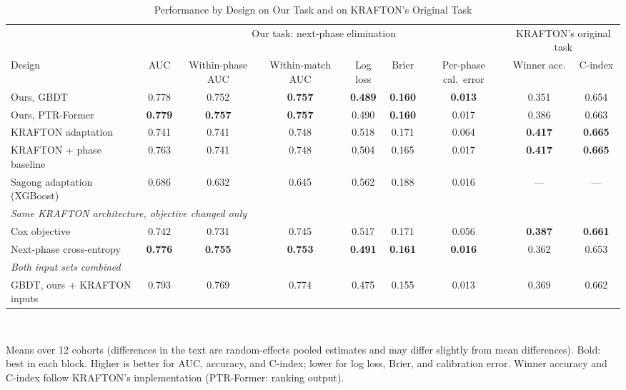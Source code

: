 \documentclass[conference]{IEEEtran}
\begin{document}
\begin{table}[t]
\centering
\caption{Performance by Design on Our Task and on KRAFTON's Original Task}
\label{tab:main}
\footnotesize
\setlength{\tabcolsep}{4pt}
\begin{tabular}{lcccccccc}
\hline
 & \multicolumn{6}{c}{Our task: next-phase elimination} & \multicolumn{2}{c}{KRAFTON's original task} \\
\cline{2-7}\cline{8-9}
Design & AUC & Within-phase AUC & Within-match AUC & Log loss & Brier & Per-phase cal.\ error & Winner acc. & C-index \\
\hline
Ours, GBDT & 0.778 & 0.752 & \textbf{0.757} & \textbf{0.489} & \textbf{0.160} & \textbf{0.013} & 0.351 & 0.654 \\
Ours, PTR-Former & \textbf{0.779} & \textbf{0.757} & \textbf{0.757} & 0.490 & \textbf{0.160} & 0.017 & 0.386 & 0.663 \\
KRAFTON adaptation & 0.741 & 0.741 & 0.748 & 0.518 & 0.171 & 0.064 & \textbf{0.417} & \textbf{0.665} \\
KRAFTON + phase baseline & 0.763 & 0.741 & 0.748 & 0.504 & 0.165 & 0.017 & \textbf{0.417} & \textbf{0.665} \\
Sagong adaptation (XGBoost) & 0.686 & 0.632 & 0.645 & 0.562 & 0.188 & 0.016 & --- & --- \\
\hline
\multicolumn{9}{l}{\emph{Same KRAFTON architecture, objective changed only}} \\
Cox objective & 0.742 & 0.731 & 0.745 & 0.517 & 0.171 & 0.056 & \textbf{0.387} & \textbf{0.661} \\
Next-phase cross-entropy & \textbf{0.776} & \textbf{0.755} & \textbf{0.753} & \textbf{0.491} & \textbf{0.161} & \textbf{0.016} & 0.362 & 0.653 \\
\hline
\multicolumn{9}{l}{\emph{Both input sets combined}} \\
GBDT, ours + KRAFTON inputs & 0.793 & 0.769 & 0.774 & 0.475 & 0.155 & 0.013 & 0.369 & 0.662 \\
\hline
\end{tabular}
\\[2pt]
\parbox{\textwidth}{\scriptsize Means over 12 cohorts (differences in the text are random-effects pooled estimates and may differ slightly from mean differences). Bold: best in each block. Higher is better for AUC, accuracy, and C-index; lower for log loss, Brier, and calibration error. Winner accuracy and C-index follow KRAFTON's implementation (PTR-Former: ranking output).}
\end{table}
\end{document}
